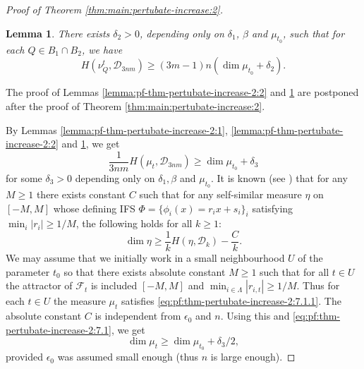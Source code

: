 \documentclass[a4paper,11pt]{amsart}
\newtheorem{lemma}[theorem]{Lemma}
\theoremstyle{definition}
\numberwithin{equation}{section}
\def\D{\mathcal{D}}
\begin{document}
\begin{proof}[Proof of Theorem  \ref{thm:main:pertubate-increase:2}]
\begin{lemma}\label{lemma:pf-thm-pertubate-increase-2:3}
There exists $\delta_2>0$,  depending only on $\delta_1$,  $\beta$ and $\mu_{t_0}$, such that for each $Q\in B_1\cap B_2$,  we have
\begin{equation}\label{eq:pf:lemma:pf-thm-pertubate-increase-2:2:1}
H(\nu_Q^{t},  \D_{3nm}) \ge  (3m-1)n (\dim \mu_{t_0}+\delta_2).
\end{equation}
\end{lemma}
The proof of Lemmas \ref{lemma:pf-thm-pertubate-increase-2:2} and \ref{lemma:pf-thm-pertubate-increase-2:3}  are postponed after the proof of Theorem \ref{thm:main:pertubate-increase:2}.  

By Lemmas \ref{lemma:pf-thm-pertubate-increase-2:1}, \ref{lemma:pf-thm-pertubate-increase-2:2} and \ref{lemma:pf-thm-pertubate-increase-2:3},   we get 
\begin{equation}\label{eq:pf:thm-pertubate-increase-2:7.1}
\frac{1}{3nm} H(\mu_{t},\D_{3nm}) \ge \dim \mu_{t_0}+\delta_3
\end{equation}
for some $\delta_3>0$ depending only on $\delta_1, \beta$ and $\mu_{t_0}$.   
It is known  (see \cite[Section 3]{Peres-Solomyak}) that for any $M\ge 1$ there exists constant $C$ such that for any self-similar measure $\eta$ on $[-M,M]$ whose defining IFS $\Phi=\{\phi_i(x)=r_ix +s_i\}_i$ satisfying $\min_i|r_i|\ge 1/M$, the following holds for all $k\ge 1$:
\begin{equation}\label{eq:pf:thm-pertubate-increase-2:7.1.1}
\dim \eta \ge \frac{1}{k} H(\eta,\D_k)-\frac{C}{k}.
\end{equation}
We may assume that we initially work in a small neighbourhood $U$ of the parameter $t_0$ so that there exists absolute constant $M\ge 1$ such that for all $t\in U$ the attractor of $\mathcal{F}_t$ is included $[-M,M]$  and $\min_{i\in \Lambda}|r_{i,t}|\ge 1/M$. Thus for each  $t\in U$ the measure $\mu_t$ satisfies  \eqref{eq:pf:thm-pertubate-increase-2:7.1.1}. The absolute constant $C$ is independent from $\epsilon_0$ and $n$.
Using this and \eqref{eq:pf:thm-pertubate-increase-2:7.1}, we get
\[
\dim \mu_t\ge \dim \mu_{t_0} +\delta_3/2,
\]
provided $\epsilon_0$ was assumed small enough (thus $n$ is large enough). 
\end{proof}
\end{document}

